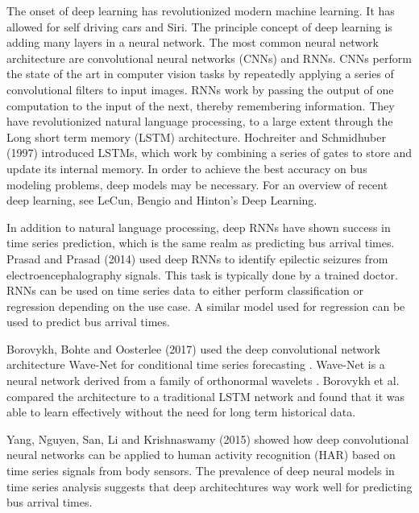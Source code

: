 The onset of deep learning has revolutionized modern machine learning.
It has allowed for self driving cars and Siri.
The principle concept of deep learning is adding many layers in a neural network.
The most common neural network architecture are convolutional neural networks (CNNs) and RNNs.
CNNs perform the state of the art in computer vision tasks by repeatedly applying a series of convolutional filters to input images.
RNNs work by passing the output of one computation to the input of the next, thereby remembering information.
They have revolutionized natural language processing, to a large extent through the Long short term memory (LSTM) architecture.
Hochreiter and Schmidhuber (1997) introduced LSTMs, which work by combining a series of gates to store and update its internal memory\cite{hochreiter1997long}.
In order to achieve the best accuracy on bus modeling problems, deep models may be necessary.
For an overview of recent deep learning, see LeCun, Bengio and Hinton's Deep Learning\cite{lecun2015deep}.

In addition to natural language processing, deep RNNs have shown success in time series prediction, which is the same realm as predicting bus arrival times.
Prasad and Prasad (2014) used deep RNNs to identify epilectic seizures from electroencephalography signals\cite{prasad2014deep}.
This task is typically done by a trained doctor.
RNNs can be used on time series data to either perform classification or regression depending on the use case.
A similar model used for regression can be used to predict bus arrival times.

Borovykh, Bohte and Oosterlee (2017) used the deep convolutional network architecture Wave-Net for conditional time series forecasting \cite{borovykh2017conditional}.
Wave-Net is a neural network derived from a family of orthonormal wavelets \cite{bakshi1993wave}.
Borovykh et al. compared the architecture to a traditional LSTM network and found that it was able to learn effectively without the need for long term historical data.


Yang, Nguyen, San, Li and Krishnaswamy (2015) showed how deep convolutional neural networks can be applied to human activity recognition (HAR) based on time series signals from body sensors\cite{yang2015deep}.
The prevalence of deep neural models in time series analysis suggests that deep architechtures way work well for predicting bus arrival times.
